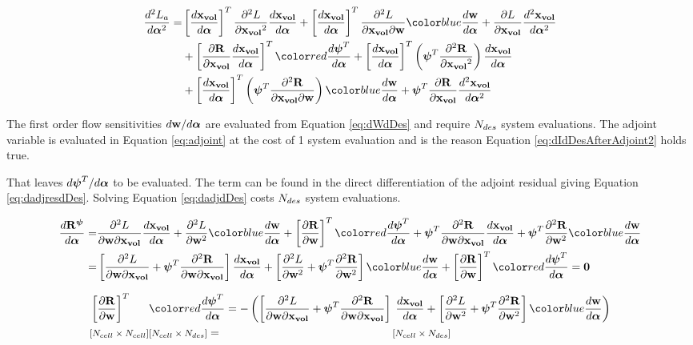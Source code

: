 \documentclass[letterpaper,12pt,]{article}
\begin{document}
\begin{equation}
\begin{split}
	\DDt{L_a}{\balfa} = 
	&
	\trans{\Dt{\xvol}{\balfa}}
	\ddel{L}{\xvol}
	\Dt{\xvol}{\balfa}
	+
	\trans{\Dt{\xvol}{\balfa}}
	\ddelm{L}{\xvol}{\bw}
	\blue{\Dt{\bw}{\balfa}}
	+
	\del{L}{\xvol}
	\DDt{\xvol}{\balfa}
	\\
	&+
	\trans{
	\del{\bR}{\xvol}
	\Dt{\xvol}{\balfa}
	}
	\red{\Dt{\bpsi^T}{\balfa}}
	+
	\trans{\Dt{\xvol}{\balfa}}
	\left(
	\bpsi^T
	\ddel{\bR}{\xvol}
	\right)
	\Dt{\xvol}{\balfa}
	\\
	&+
	\trans{\Dt{\xvol}{\balfa}}
	\left(
	\bpsi^T
	\ddelm{\bR}{\xvol}{\bw}
	\right)
	\blue{\Dt{\bw}{\balfa}}
	+
	\bpsi^T
	\del{\bR}{\xvol}
	\DDt{\xvol}{\balfa}
\label{eq:ADHessian}
\end{split}
\end{equation}

The first order flow sensitivities $d\mathbf{w}/d\boldsymbol{\alpha}$ are evaluated from Equation \ref{eq:dWdDes} and require $N_{des}$ system evaluations.
The adjoint variable is evaluated in Equation \ref{eq:adjoint} at the cost of 1 system evaluation and is the reason Equation \ref{eq:dIdDesAfterAdjoint2} holds true.

That leaves $d\boldsymbol{\psi}^T/d\boldsymbol{\alpha}$ to be evaluated.
The term can be found in the direct differentiation of the adjoint residual giving Equation \ref{eq:dadjresdDes}.
Solving Equation \ref{eq:dadjdDes} costs $N_{des}$ system evaluations.

\begin{equation}
\begin{split}
	\Dt{\bR^{\bpsi}}{\balfa}
	=&
	\ddelm{L}{\bw}{\xvol}
	\Dt{\xvol}{\balfa}
	+
	\ddel{L}{\bw}
	\blue{\Dt{\bw}{\balfa}}
	+
	\trans{\del{\bR}{\bw}}
	\red{\Dt{\bpsi^T}{\balfa}}
	+
	\bpsi^T
	\ddelm{\bR}{\bw}{\xvol}
	\Dt{\xvol}{\balfa}
	+
	\bpsi^T
	\ddel{\bR}{\bw}
	\blue{\Dt{\bw}{\balfa}}
	\\
	=&
	\left[
	\ddelm{L}{\bw}{\xvol}
	+
	\bpsi^T
	\ddelm{\bR}{\bw}{\xvol}
	\right]
	\Dt{\xvol}{\balfa}
	+
	\left[
		\ddel{L}{\bw}
		+
		\bpsi^T
		\ddel{\bR}{\bw}
	\right]
	\blue{\Dt{\bw}{\balfa}}
	+
	\trans{\del{\bR}{\bw}}
	\red{\Dt{\bpsi^T}{\balfa}} = \mbf{0}
\label{eq:dadjresdDes}
\end{split}
\end{equation}

\begin{equation}
\begin{alignedat}{4}
	&\trans{\del{\bR}{\bw}}
	&&\red{\Dt{\bpsi^T}{\balfa}}
	=
	-\left(
	\left[
	\ddelm{L}{\bw}{\xvol}
	+
	\bpsi^T
	\ddelm{\bR}{\bw}{\xvol}
	\right]
	\right.&&
	\left.
	\Dt{\xvol}{\balfa}
	+
	\left[
		\ddel{L}{\bw}
		+
		\bpsi^T
		\ddel{\bR}{\bw}
	\right]
	\blue{\Dt{\bw}{\balfa}}
	\right)
\\
	& \nxn{\ncell}{\ncell}
	&& \nxn{\ncell}{\ndes}
	=
	&& \nxn{\ncell}{\ndes}
\label{eq:dadjdDes}
\end{alignedat}
\end{equation}
\end{document}
